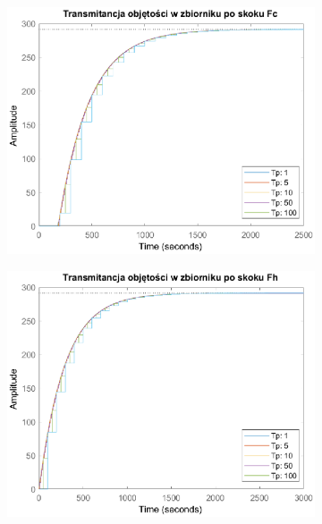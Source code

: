 \begin{figure}[h!]
   \centering
   \begin{subfigure}[b]{0.6\textwidth}
      \includegraphics[width=1\linewidth]{img/transforms/transformVFc.eps}
      \caption{}
      \label{fig:fig:transformV1}
   \end{subfigure}
       
   \begin{subfigure}[b]{0.6\textwidth}
      \includegraphics[width=1\linewidth]{img/transforms/transformVFh.eps}
      \caption{}
      \label{fig:fig:transformV2}
   \end{subfigure}
       

\end{figure}

